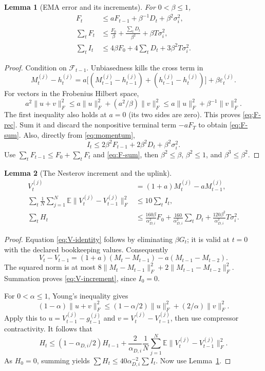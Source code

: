 \documentclass[11pt]{article}
\newtheorem{lemma}{Lemma}
\newcommand{\E}{\mathbb E}
\newcommand{\frob}[1]{\lVert #1\rVert_F}
\newcommand{\avg}{\frac1N\sum_{j=1}^N}
\begin{document}
\begin{lemma}[EMA error and its increments]\label{lem:ema}
For $0<\beta\le1$,
\begin{align}
 F_t&\le aF_{t-1}+\beta^{-1}D_t+\beta^2\sigma_i^2,\label{eq:F-rec}\\
 \sum_tF_t&\le\frac{F_0}\beta+\frac{\sum_tD_t}{\beta^2}
                    +\beta T\sigma_i^2,\label{eq:F-sum}\\
 \sum_tI_t&\le4\beta F_0+4\sum_tD_t+3\beta^2T\sigma_i^2.
 \label{eq:I-sum}
\end{align}
\end{lemma}
\begin{proof}
Condition on $\mathcal F_{t-1}$. Unbiasedness kills the cross term in
\[
 M_t^{(j)}-h_t^{(j)}
 =a\bigl[(M_{t-1}^{(j)}-h_{t-1}^{(j)})
                +(h_{t-1}^{(j)}-h_t^{(j)})\bigr]
        +\beta\varepsilon_t^{(j)}.
\]
For vectors in the Frobenius Hilbert space,
\[
 a^2\frob{u+v}^2
 \le a\frob u^2+(a^2/\beta)\frob v^2
 \le a\frob u^2+\beta^{-1}\frob v^2.
\]
The first inequality also holds at $a=0$ (its two sides are zero).
This proves \eqref{eq:F-rec}. Sum it and discard the nonpositive
terminal term $-aF_T$ to obtain \eqref{eq:F-sum}.
Also, directly from \eqref{eq:momentum},
\[
 I_t\le2\beta^2F_{t-1}+2\beta^2D_t+\beta^2\sigma_i^2.
\]
Use $\sum_tF_{t-1}\le F_0+\sum_tF_t$ and \eqref{eq:F-sum},
then $\beta^2\le\beta$, $\beta^2\le1$, and $\beta^3\le\beta^2$.
\end{proof}

\begin{lemma}[The Nesterov increment and the uplink]\label{lem:uplink}
\begin{align}
 V_t^{(j)}&=(1+a)M_t^{(j)}-aM_{t-1}^{(j)},\label{eq:V-identity}\\
 \sum_t\avg\E\frob{V_t^{(j)}-V_{t-1}^{(j)}}^2
 &\le10\sum_t I_t,\label{eq:V-increment}\\
 \sum_tH_t&\le\frac{160\beta}{\alpha_{D,i}^2}F_0
       +\frac{160}{\alpha_{D,i}^2}\sum_tD_t
       +\frac{120\beta^2}{\alpha_{D,i}^2}T\sigma_i^2.
 \label{eq:H-sum}
\end{align}
\end{lemma}
\begin{proof}
Equation \eqref{eq:V-identity} follows by eliminating $\beta G_t$;
it is valid at $t=0$ with the declared bookkeeping values. Consequently
\[
 V_t-V_{t-1}=(1+a)(M_t-M_{t-1})-a(M_{t-1}-M_{t-2}).
\]
The squared norm is at most $8\frob{M_t-M_{t-1}}^2+
2\frob{M_{t-1}-M_{t-2}}^2$. Summation proves
\eqref{eq:V-increment}, since $I_0=0$.

For $0<\alpha\le1$, Young's inequality gives
\begin{equation}\label{eq:contracted-sum}
 (1-\alpha)\frob{u+v}^2
 \le(1-\alpha/2)\frob u^2+(2/\alpha)\frob v^2.
\end{equation}
Apply this to $u=V_{t-1}^{(j)}-g_{t-1}^{(j)}$ and
$v=V_t^{(j)}-V_{t-1}^{(j)}$, then use compressor contractivity.
It follows that
\[
 H_t\le(1-\alpha_{D,i}/2)H_{t-1}
       +\frac2{\alpha_{D,i}}\avg\E\frob{V_t^{(j)}-V_{t-1}^{(j)}}^2.
\]
As $H_0=0$, summing yields $\sum H_t\le40\alpha_{D,i}^{-2}\sum I_t$.
Now use Lemma~\ref{lem:ema}.
\end{proof}
\end{document}
